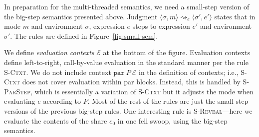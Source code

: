 \documentclass[10pt]{article}
\newcommand{\rulelab}[1]{{\small \textsc{#1}}}
\newcommand{\kw}[1]{\ensuremath{\mathtt{#1}}}
\newcommand{\epar}[2]{\ensuremath{\kw{par}~{#1}~{#2}}}
\newcommand{\seval}[5]{\ensuremath{\config{#1}{#3} \rightsquigarrow_{#2} \config{#4}{#5}}}
\newcommand{\env}{\ensuremath{\sigma}}
\newcommand{\config}[2]{\ensuremath{\langle{#1},{#2}\rangle}}
\newcommand{\ctxt}{\ensuremath{\mathcal{E}}}
\begin{document}
In preparation for the multi-threaded semantics, we need a small-step
version of the big-step semantics presented above. Judgment
$\seval{\env}{e}{m}{\env'}{e'}$ states that in mode $m$ and
environment $\env$, expression $e$ steps to expression $e'$ and
environment $\env'$. The rules are defined in
Figure~\ref{fig:small-sem}. 

We define \emph{evaluation contexts} $\ctxt$ at the bottom of the
figure. Evaluation contexts define left-to-right, 
call-by-value evaluation in the standard manner per the rule
\rulelab{S-Ctxt}. We do not include context $\epar{P}{\ctxt}$ in the
definition of contexts; i.e., \rulelab{S-Ctxt} does not cover
evaluation within par blocks. Instead, this is handled by
\rulelab{S-ParStep}, which is essentially a variation of
\rulelab{S-Ctxt} but it adjusts the mode when evaluating $e$ according
to $P$. Most of the rest of the rules are just the small-step versions
of the previous big-step rules. One interesting rule is
\rulelab{S-Reveal}---here we evaluate the contents of the share $e_0$
in one fell swoop, using the big-step semantics.
\end{document}

